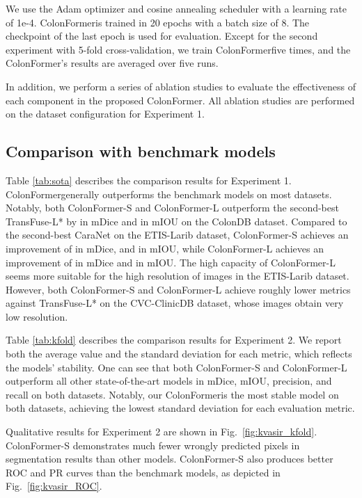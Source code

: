 \documentclass{article}
\newcommand{\ModelName}{ColonFormer}
\begin{document}
{We use the Adam optimizer and cosine annealing scheduler with a learning rate of 1e-4. \ModelName is trained in 20 epochs with a batch size of 8. The checkpoint of the last epoch is used for evaluation. Except for the second experiment with 5-fold cross-validation, we train \ModelName five times, and the \ModelName's results are averaged over five runs.

In addition, we perform a series of ablation studies to evaluate the effectiveness of each component in the proposed \ModelName. All ablation studies are performed on the dataset configuration for Experiment 1.


\subsection{Comparison with benchmark models}
Table \ref{tab:sota} describes the comparison results for Experiment 1. \ModelName generally outperforms the benchmark models on most datasets. Notably, both \ModelName-S and \ModelName-L outperform the second-best TransFuse-L* by  in mDice and  in mIOU on the ColonDB dataset. Compared to the second-best CaraNet on the ETIS-Larib dataset, \ModelName-S achieves an improvement of  in mDice, and  in mIOU, while \ModelName-L achieves an improvement of  in mDice and  in mIOU. The high capacity of \ModelName-L seems more suitable for the high resolution of images in the ETIS-Larib dataset. 
However, both \ModelName-S and \ModelName-L achieve roughly  lower metrics against TransFuse-L* on the CVC-ClinicDB dataset, whose images obtain very low resolution.

Table \ref{tab:kfold} describes the comparison results for Experiment 2. We report both the average value and the standard deviation for each metric, which reflects the models' stability. One can see that both \ModelName-S and \ModelName-L outperform all other state-of-the-art models in mDice, mIOU, precision, and recall on both datasets. Notably, our \ModelName is the most stable model on both datasets, achieving the lowest standard deviation for each evaluation metric.

Qualitative results for Experiment 2 are shown in Fig.~\ref{fig:kvasir_kfold}. \ModelName-S demonstrates much fewer wrongly predicted pixels in segmentation results than other models. \ModelName-S also produces better ROC and PR curves than the benchmark models, as depicted in  Fig.~\ref{fig:kvasir_ROC}.

}
\end{document}
